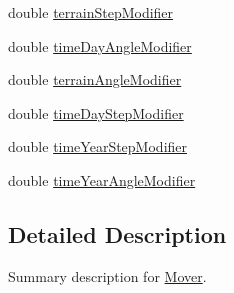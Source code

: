 \begin{DoxyCompactItemize}
double \hyperlink{class_s_e_a_r_c_h_1_1_mover_a09fda49c5f301e043fbe3fee2e5bf2eb}{terrain\-Step\-Modifier}
\item 
double \hyperlink{class_s_e_a_r_c_h_1_1_mover_a1fb4ef0de58f74cdda8ba9487b4fe78c}{time\-Day\-Angle\-Modifier}
\item 
double \hyperlink{class_s_e_a_r_c_h_1_1_mover_a64d50790add5dc402d87727fc149b8ee}{terrain\-Angle\-Modifier}
\item 
double \hyperlink{class_s_e_a_r_c_h_1_1_mover_a7aea3c84939c22c9936941d025db6221}{time\-Day\-Step\-Modifier}
\item 
double \hyperlink{class_s_e_a_r_c_h_1_1_mover_ad3fbdb8aa27d97c46638cbf5cb80ed2e}{time\-Year\-Step\-Modifier}
\item 
double \hyperlink{class_s_e_a_r_c_h_1_1_mover_a73145c64b8c7be641c632dca87dc492d}{time\-Year\-Angle\-Modifier}
\end{DoxyCompactItemize}


\subsection{Detailed Description}
Summary description for \hyperlink{class_s_e_a_r_c_h_1_1_mover}{Mover}. 



